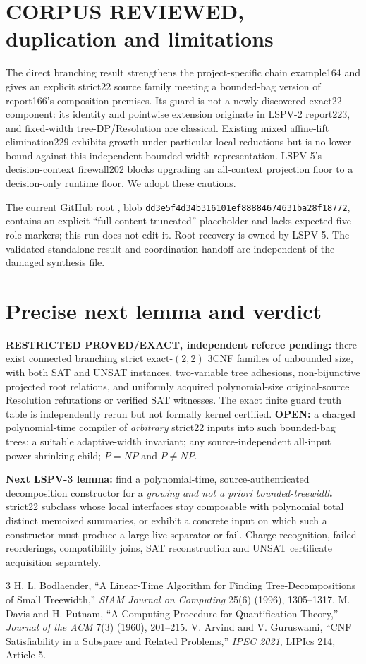 \documentclass[11pt]{article}
\begin{document}
\section{CORPUS REVIEWED, duplication and limitations}
The direct branching result strengthens the project-specific chain example164 and gives an explicit strict22 source family meeting a bounded-bag version of report166's composition premises. Its guard is not a newly discovered exact22 component: its identity and pointwise extension originate in LSPV-2 report223, and fixed-width tree-DP/Resolution are classical. Existing mixed affine-lift elimination229 exhibits growth under particular local reductions but is no lower bound against this independent bounded-width representation. LSPV-5's decision-context firewall202 blocks upgrading an all-context projection floor to a decision-only runtime floor. We adopt these cautions.

The current GitHub root , blob \texttt{dd3e5f4d34b316101ef88884674631ba28f18772}, contains an explicit ``full content truncated'' placeholder and lacks expected five role markers; this run does not edit it. Root recovery is owned by LSPV-5. The validated standalone result and coordination handoff are independent of the damaged synthesis file.

\section{Precise next lemma and verdict}
\textbf{RESTRICTED PROVED/EXACT, independent referee pending:} there exist connected branching strict exact-$(2,2)$ 3CNF families of unbounded size, with both SAT and UNSAT instances, two-variable tree adhesions, non-bijunctive projected root relations, and uniformly acquired polynomial-size original-source Resolution refutations or verified SAT witnesses. The exact finite guard truth table is independently rerun but not formally kernel certified. \textbf{OPEN:} a charged polynomial-time compiler of \emph{arbitrary} strict22 inputs into such bounded-bag trees; a suitable adaptive-width invariant; any source-independent all-input power-shrinking child; $P=NP$ and $P\ne NP$.

\noindent\textbf{Next LSPV-3 lemma:} find a polynomial-time, source-authenticated decomposition constructor for a \emph{growing and not a priori bounded-treewidth} strict22 subclass whose local interfaces stay composable with polynomial total distinct memoized summaries, or exhibit a concrete input on which such a constructor must produce a large live separator or fail. Charge recognition, failed reorderings, compatibility joins, SAT reconstruction and UNSAT certificate acquisition separately.

\begin{thebibliography}{3}
 H. L. Bodlaender, ``A Linear-Time Algorithm for Finding Tree-Decompositions of Small Treewidth,'' \emph{SIAM Journal on Computing} 25(6) (1996), 1305--1317.
 M. Davis and H. Putnam, ``A Computing Procedure for Quantification Theory,'' \emph{Journal of the ACM} 7(3) (1960), 201--215.
 V. Arvind and V. Guruswami, ``CNF Satisfiability in a Subspace and Related Problems,'' \emph{IPEC 2021}, LIPIcs 214, Article 5.
\end{thebibliography}
\end{document}
